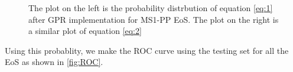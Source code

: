 \begin{figure}[htp]
  \centering
  \quad
  \caption{The plot on the left is the probability distrbution of equation \ref{eq:1} after GPR implementation for MS1-PP EoS.  The plot on the right is a similar plot of equation \ref{eq:2}  }
  \label{fig:probability}
\end{figure}

Using this probablity, we make the ROC curve using the testing set for all the EoS as shown in \ref{fig:ROC}. 

